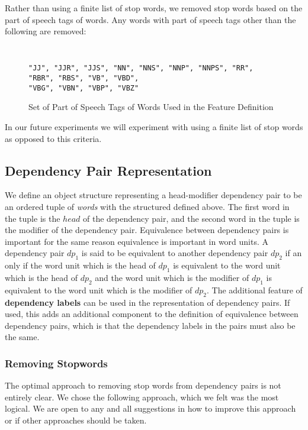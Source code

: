\documentclass[11pt]{article}
\begin{document}
Rather than using a finite list of stop words, we removed stop words based on the part of speech tags of words. Any words with part of speech tags other than the following are removed:

\begin{figure}[H]
\begin{shaded} \tt
\begin{verbatim}
"JJ", "JJR", "JJS", "NN", "NNS", "NNP", "NNPS", "RR", "RBR", "RBS", "VB", "VBD", 
"VBG", "VBN", "VBP", "VBZ"
\end{verbatim}
\end{shaded}
\caption{Set of Part of Speech Tags of Words Used in the Feature Definition}
\label{fig:KeeperPOS}
\end{figure}

In our future experiments we will experiment with using a finite list of stop words as opposed to this criteria.

\subsection{Dependency Pair Representation}

We define an object structure representing a head-modifier dependency pair to be an ordered tuple of \emph{words} with the structured defined above. The first word in the tuple is the $head$ of the dependency pair, and the second word in the tuple is the modifier of the dependency pair.  Equivalence between dependency pairs is important for the same reason equivalence is important in word units. A dependency pair $dp_1$ is said to be equivalent to another dependency pair $dp_2$ if an only if the word unit which is the head of $dp_1$ is equivalent to the word unit which is the head of $dp_2$ and the word unit which is the modifier of $dp_1$ is equivalent to the word unit which is the modifier of $dp_2$. The additional feature of \textbf{dependency labels} can be used in the representation of dependency pairs. If used, this adds an additional component to the definition of equivalence between dependency pairs, which is that the dependency labels in the pairs must also be the same.

\subsubsection{Removing Stopwords}

The optimal approach to removing stop words from dependency pairs is not entirely clear. We chose the following approach, which we felt was the most logical. We are open to any and all suggestions in how to improve this approach or if other approaches should be taken. 
\end{document}
